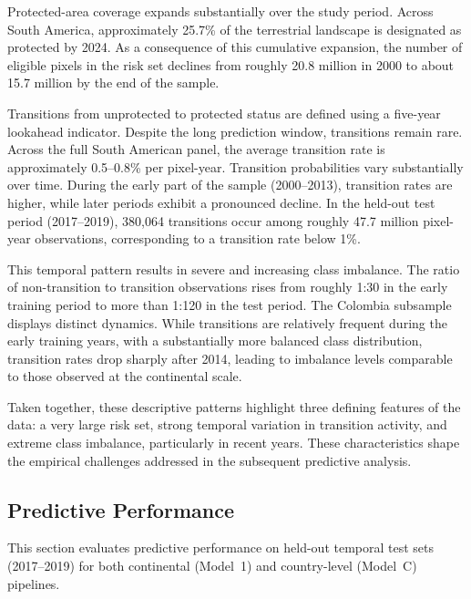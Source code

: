 \documentclass[12pt]{article}
\theoremstyle{break} %
\begin{document}
Protected-area coverage expands substantially over the study period. Across South America, approximately 25.7\% of the terrestrial landscape is designated as protected by 2024. As a consequence of this cumulative expansion, the number of eligible pixels in the risk set declines from roughly 20.8 million in 2000 to about 15.7 million by the end of the sample.

Transitions from unprotected to protected status are defined using a five-year lookahead indicator. Despite the long prediction window, transitions remain rare. Across the full South American panel, the average transition rate is approximately 0.5--0.8\% per pixel-year. Transition probabilities vary substantially over time. During the early part of the sample (2000--2013), transition rates are higher, while later periods exhibit a pronounced decline. In the held-out test period (2017--2019), 380{,}064 transitions occur among roughly 47.7 million pixel-year observations, corresponding to a transition rate below 1\%.

This temporal pattern results in severe and increasing class imbalance. The ratio of non-transition to transition observations rises from roughly 1:30 in the early training period to more than 1:120 in the test period. The Colombia subsample displays distinct dynamics. While transitions are relatively frequent during the early training years, with a substantially more balanced class distribution, transition rates drop sharply after 2014, leading to imbalance levels comparable to those observed at the continental scale.

Taken together, these descriptive patterns highlight three defining features of the data: a very large risk set, strong temporal variation in transition activity, and extreme class imbalance, particularly in recent years. These characteristics shape the empirical challenges addressed in the subsequent predictive analysis.


\subsection{Predictive Performance}
\label{results:performance}

This section evaluates predictive performance on held-out temporal test sets (2017--2019) for both continental (Model~1) and country-level (Model~C) pipelines.
\end{document}
